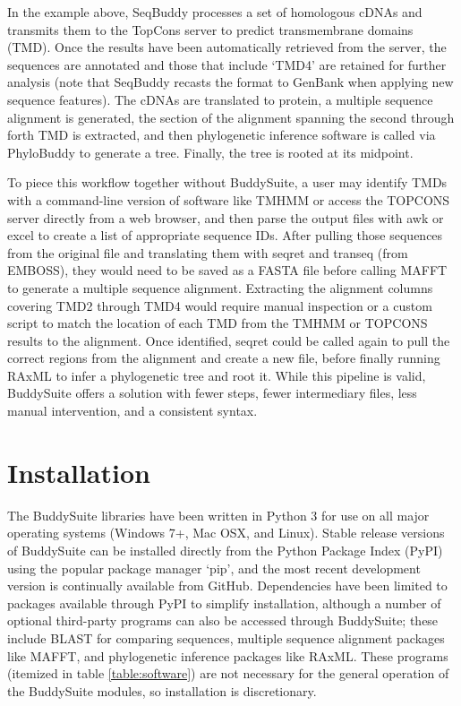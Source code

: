 \documentclass[nogrid]{MBE_article}%
\begin{document}
In the example above, SeqBuddy processes a set of homologous cDNAs and transmits them to the TopCons server \cite{Tsirigos:2015eo} to predict transmembrane domains (TMD). Once the results have been automatically retrieved from the server, the sequences are annotated and those that include `TMD4' are retained for further analysis (note that SeqBuddy recasts the format to GenBank when applying new sequence features). The cDNAs are translated to protein, a multiple sequence alignment is generated, the section of the alignment spanning the second through forth TMD is extracted, and then phylogenetic inference software is called via PhyloBuddy to generate a tree. Finally, the tree is rooted at its midpoint.

To piece this workflow together without BuddySuite, a user may identify TMDs with a command-line version of software like TMHMM \cite{Krogh:2001bv} or access the TOPCONS server directly from a web browser, and then parse the output files with awk or excel to create a list of appropriate sequence IDs. After pulling those sequences from the original file and translating them with seqret and transeq (from EMBOSS), they would need to be saved as a FASTA file before calling MAFFT to generate a multiple sequence alignment. Extracting the alignment columns covering TMD2 through TMD4 would require manual inspection or a custom script to match the location of each TMD from the TMHMM or TOPCONS results to the alignment. Once identified, seqret could be called again to pull the correct regions from the alignment and create a new file, before finally running RAxML to infer a phylogenetic tree and root it. While this pipeline is valid, BuddySuite offers a solution with fewer steps, fewer intermediary files, less manual intervention, and a consistent syntax. 


\section{Installation}
The BuddySuite libraries have been written in Python 3 for use on all major operating systems (Windows 7+, Mac OSX, and Linux). Stable release versions of BuddySuite can be installed directly from the Python Package Index (PyPI) using the popular package manager `pip', and the most recent development version is continually available from GitHub. Dependencies have been limited to packages available through PyPI to simplify installation, although a number of optional third-party programs can also be accessed through BuddySuite; these include BLAST for comparing sequences, multiple sequence alignment packages like MAFFT, and phylogenetic inference packages like RAxML. These programs (itemized in table \ref{table:software}) are not necessary for the general operation of the BuddySuite modules, so installation is discretionary.
\end{document}
